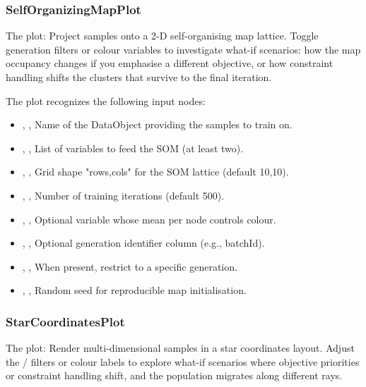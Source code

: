 \subsubsection{SelfOrganizingMapPlot}
The   plot: Project samples onto a 2-D self-organising map lattice. Toggle generation filters or colour variables to investigate what-if scenarios: how the map occupancy changes if you emphasise a different objective, or how constraint handling shifts the clusters that survive to the final iteration.

The  plot recognizes the following input nodes:
\begin{itemize}
  \item {}, , Name of the DataObject providing the samples to train on.
  \item {}, , List of variables to feed the SOM (at least two).
  \item {}, , Grid shape "rows,cols" for the SOM lattice (default 10,10).
  \item {}, , Number of training iterations (default 500).
  \item {}, , Optional variable whose mean per node controls colour.
  \item {}, , Optional generation identifier column (e.g., batchId).
  \item {}, , When  present, restrict to a specific generation.
  \item {}, , Random seed for reproducible map initialisation.
\end{itemize}

\subsubsection{StarCoordinatesPlot}
The   plot: Render multi-dimensional samples in a star coordinates layout. Adjust the / filters or colour labels to explore what-if scenarios where objective priorities or constraint handling shift, and the population migrates along different rays.

